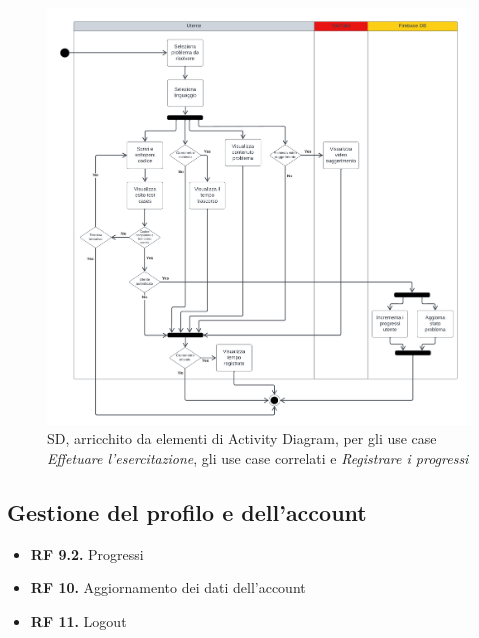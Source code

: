 \documentclass[11pt, a4paper]{article}
\theoremstyle{definition} %
\begin{document}
\begin{figure}[H]
\centering
\hspace*{-0.48cm}
\includegraphics[scale=0.444]{materiale/acesercitazione.pdf}
\caption{SD, arricchito da elementi di Activity Diagram,
per gli use case \textit{Effetuare l'esercitazione}, gli use case correlati
e \textit{Registrare i progressi}}
\label{acexercise}
\end{figure}


\newpage
\subsection{Gestione del profilo e dell'account}
\begin{itemize}
    \item \textbf{RF 9.2.} Progressi
    \item \textbf{RF 10.} Aggiornamento dei dati dell'account
    \item \textbf{RF 11.} Logout
\end{itemize}
\end{document}
